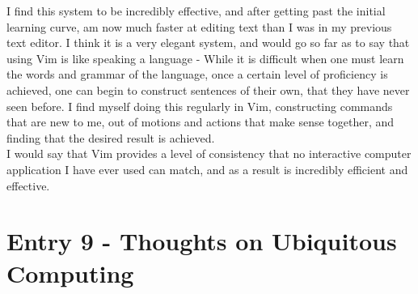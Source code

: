 \documentclass{article}
\begin{document}
I find this system to be incredibly effective, and after getting past the initial learning curve, am now much faster at editing text than I was in my previous text editor. I think it is a very elegant system, and would go so far as to say that using Vim is like speaking a language - While it is difficult when one must learn the words and grammar of the language, once a certain level of proficiency is achieved, one can begin to construct sentences of their own, that they have never seen before. I find myself doing this regularly in Vim, constructing commands that are new to me, out of motions and actions that make sense together, and finding that the desired result is achieved.
\\\indent I would say that Vim provides a level of consistency that no interactive computer application I have ever used can match, and as a result is incredibly efficient and effective.

\section*{Entry 9 - Thoughts on Ubiquitous Computing}
\end{document}
